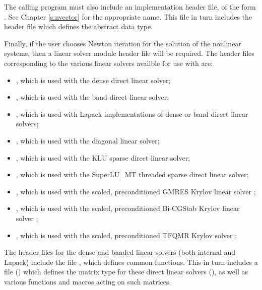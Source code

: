 The calling program must also include an {\nvector} implementation header file,
of the form .  See Chapter \ref{s:nvector} for the appropriate
name.  This file in turn includes the header file 
which defines the abstract  data type. 

Finally, if the user chooses Newton iteration for the solution of the nonlinear
systems, then a linear solver module header file will be required. 
The header files corresponding to the various linear solvers availble for use
with {\cvode} are:
\begin{itemize}
\item {}, 
  which is used with the dense direct linear solver;

\item {}, 
  which is used with the band direct linear solver;

\item {},
  which is used with Lapack implementations of dense or band direct linear solvers;
  
\item {}, 
  which is used with the diagonal linear solver;

\item {}, 
  which is used with the KLU sparse direct linear solver;

\item {}, 
  which is used with the SuperLU\_MT threaded sparse direct linear solver;

\item {}, 
  which is used with the scaled, preconditioned GMRES Krylov linear solver {\spgmr};

\item {}, 
  which is used with the scaled, preconditioned Bi-CGStab Krylov linear solver {\spbcg};

\item {}, 
  which is used with the scaled, preconditioned TFQMR Krylov solver {\sptfqmr};
\end{itemize}

The header files for the dense and banded linear solvers (both
internal and Lapack) include the file , which
defines common functions.  This in turn includes a file
() which defines the matrix type for these
direct linear solvers (), as well as various functions and
macros acting on such matrices.

